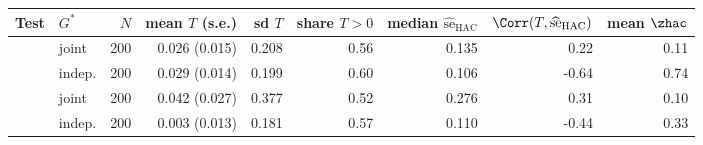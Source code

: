 \begin{tabular}{llrrrrrrr}
\toprule
Test & $G^*$ & $N$ & mean $T$ (s.e.) & sd $T$ & share $T>0$ & median $\widehat{\mathrm{se}}_{\mathrm{HAC}}$ & $\Corr(T,\widehat{\mathrm{se}}_{\mathrm{HAC}})$ & mean $\zhac$ \\
\midrule
\WC{} & joint & 200 & 0.026 (0.015) & 0.208 & 0.56 & 0.135 & 0.22 & 0.11 \\
 & indep. & 200 & 0.029 (0.014) & 0.199 & 0.60 & 0.106 & -0.64 & 0.74 \\
\addlinespace[2pt]
\LRC{} & joint & 200 & 0.042 (0.027) & 0.377 & 0.52 & 0.276 & 0.31 & 0.10 \\
 & indep. & 200 & 0.003 (0.013) & 0.181 & 0.57 & 0.110 & -0.44 & 0.33 \\
\bottomrule
\end{tabular}
